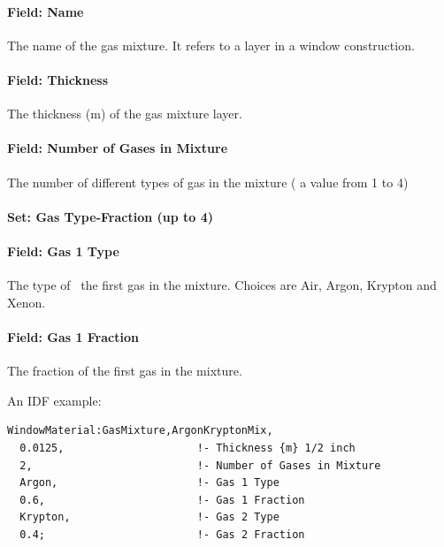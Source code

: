 \paragraph{Field: Name}\label{field-name-11-014}

The name of the gas mixture. It refers to a layer in a window construction.

\paragraph{Field: Thickness}\label{field-thickness-4}

The thickness (m) of the gas mixture layer.

\paragraph{Field: Number of Gases in Mixture}\label{field-number-of-gases-in-mixture}

The number of different types of gas in the mixture ( a value from 1 to 4)

\paragraph{Set: Gas Type-Fraction (up to 4)}\label{set-gas-type-fraction-up-to-4}

\paragraph{Field: Gas 1 Type}\label{field-gas-1-type}

The type of~ the first gas in the mixture. Choices are Air, Argon, Krypton and Xenon.

\paragraph{Field: Gas 1 Fraction}\label{field-gas-1-fraction}

The fraction of the first gas in the mixture.

An IDF example:

\begin{lstlisting}
WindowMaterial:GasMixture,ArgonKryptonMix,
  0.0125,                     !- Thickness {m} 1/2 inch
  2,                          !- Number of Gases in Mixture
  Argon,                      !- Gas 1 Type
  0.6,                        !- Gas 1 Fraction
  Krypton,                    !- Gas 2 Type
  0.4;                        !- Gas 2 Fraction
\end{lstlisting}

